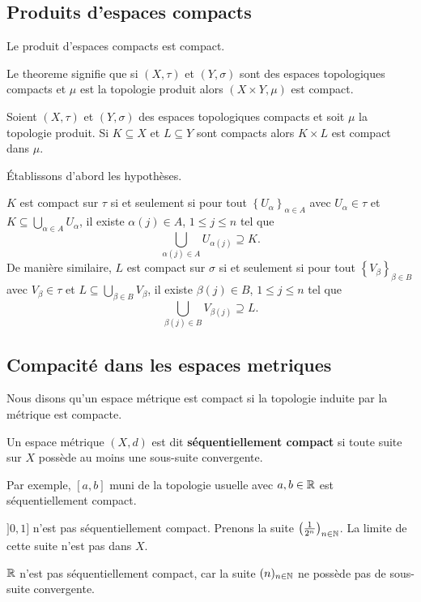 \documentclass[french]{article}
\begin{document}
\subsection{Produits d'espaces compacts}
\begin{theoreme}[Tychonoff]
  Le produit d'espaces compacts est compact.
\end{theoreme}
Le theoreme signifie que si $(X, \tau)$ et $(Y, \sigma)$ sont des espaces topologiques compacts et $\mu$ est la topologie produit alors $(X \times Y, \mu)$ est compact.

\begin{theoreme}
  Soient $(X, \tau)$ et  $(Y, \sigma)$ des espaces topologiques compacts et soit $\mu$ la topologie produit. Si $K \subseteq X$ et $L \subseteq Y$ sont compacts alors $K \times L$ est compact dans $\mu$.

  \tcblower
  \begin{preuve}
    Établissons d'abord les hypothèses.
    \par $K$ est compact sur $\tau$ si et seulement si pour tout $\left\{ U_\alpha \right\}_{\alpha \in A}$ avec $U_\alpha \in \tau$ et $K \subseteq \bigcup\limits_{\alpha \in A} U_\alpha$, il existe $\alpha(j) \in A$, $1 \leq j \leq n$ tel que
    $$\bigcup_{\alpha(j) \in A} U_{\alpha(j)} \supseteq K.$$
    De manière similaire, $L$ est compact sur $\sigma$ si et seulement si pour tout $\left\{ V_\beta \right\}_{\beta \in B}$ avec $V_\beta \in \tau$ et $L \subseteq \bigcup\limits_{\beta \in B} V_\beta$, il existe $\beta(j) \in B$, $1 \leq j \leq n$ tel que
    $$\bigcup_{\beta(j) \in B} V_{\beta(j)} \supseteq L.$$
  \end{preuve}
\end{theoreme}

\subsection{Compacité dans les espaces metriques}
Nous disons qu'un espace métrique est compact si la topologie induite par la métrique est compacte.

\begin{definition}
  Un espace métrique $(X, d)$ est dit \textbf{séquentiellement compact} si toute suite sur $X$ possède au moins une sous-suite convergente.
\end{definition}
Par exemple, $[a, b]$ muni de la topologie usuelle avec $a, b \in \mathbb{R}$ est séquentiellement compact.
\par $]0, 1]$ n'est pas séquentiellement compact. Prenons la suite $\left( \frac{1}{2^n} \right)_{n \in \mathbb{N}}$. La limite de cette suite n'est pas dans $X$.
\par  $\mathbb{R}$ n'est pas séquentiellement compact, car la suite $(n)_{n \in \mathbb{N}}$ ne possède pas de sous-suite convergente.
\end{document}
